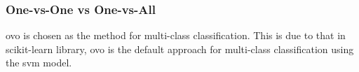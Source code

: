 \subsubsection{One-vs-One vs One-vs-All}\label{subsubsec:one-vs-one-vs-one-vs-all}
\gls{ovo} is chosen as the method for multi-class classification. This is due to that in scikit-learn library, \gls{ovo} is the default approach for multi-class classification using the \gls{svm} model. 